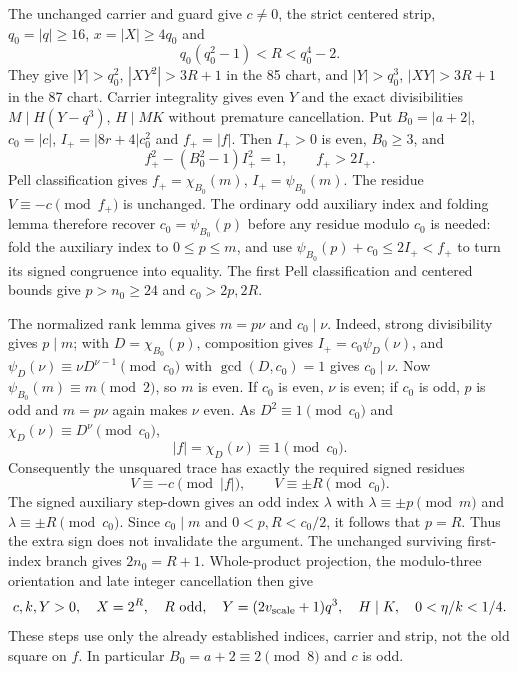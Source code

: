 The unchanged carrier and guard give $c\ne0$, the strict centered strip,
$q_0=|q|\ge16$, $x=|X|\ge4q_0$ and
\[
 q_0(q_0^2-1)<R<q_0^4-2.
\]
They give $|Y|>q_0^2$, $|XY^2|>3R+1$ in the 85 chart, and $|Y|>q_0^3$,
$|XY|>3R+1$ in the 87 chart. Carrier integrality gives even $Y$ and the exact
divisibilities $M\mid H(Y-q^3)$, $H\mid MK$ without premature cancellation.
Put $B_0=|a+2|$, $c_0=|c|$, $I_+=|8r+4|c_0^2$ and $f_+=|f|$.
Then $I_+>0$ is even, $B_0\ge3$, and
\[
 f_+^2-(B_0^2-1)I_+^2=1,\qquad f_+>2I_+.
\]
Pell classification gives $f_+=\chi_{B_0}(m)$, $I_+=\psi_{B_0}(m)$.
The residue $V\equiv-c\pmod {f_+}$ is unchanged. The ordinary odd auxiliary
index and folding lemma therefore recover $c_0=\psi_{B_0}(p)$ before any
residue modulo $c_0$ is needed: fold the auxiliary index to $0\le p\le m$,
and use $\psi_{B_0}(p)+c_0\le2I_+<f_+$ to turn its signed congruence into
equality. The first Pell classification and centered bounds give $p>n_0\ge24$
and $c_0>2p,2R$.

The normalized rank lemma gives $m=p\nu$ and $c_0\mid\nu$. Indeed, strong
divisibility gives $p\mid m$; with $D=\chi_{B_0}(p)$, composition gives
$I_+=c_0\psi_D(\nu)$, and
$\psi_D(\nu)\equiv \nu D^{\nu-1}\pmod {c_0}$ with $\gcd(D,c_0)=1$ gives $c_0\mid\nu$.
Now $\psi_{B_0}(m)\equiv m\pmod2$, so $m$ is even. If $c_0$ is even,
$\nu$ is even; if $c_0$ is odd, $p$ is odd and $m=p\nu$ again makes $\nu$ even.
As $D^2\equiv1\pmod {c_0}$ and $\chi_D(\nu)\equiv D^\nu\pmod {c_0}$,
\[
 |f|=\chi_D(\nu)\equiv1\pmod {c_0}.
\]
Consequently the unsquared trace has exactly the required signed residues
\[
 V\equiv-c\pmod {|f|},\qquad V\equiv\pm R\pmod {c_0}.
\]
The signed auxiliary step-down gives an odd index $\lambda$ with
$\lambda\equiv\pm p\pmod m$ and $\lambda\equiv\pm R\pmod {c_0}$.
Since $c_0\mid m$ and $0<p,R<c_0/2$, it follows that $p=R$.
Thus the extra sign does not invalidate the argument. The unchanged surviving
first-index branch gives $2n_0=R+1$. Whole-product projection, the modulo-three
orientation and late integer cancellation then give
\[
 c,k,Y>0,\quad X=2^R,\quad R\ \text{odd},\quad
 Y=(2v_{\rm scale}+1)q^3,\quad H\mid K,\quad0<\eta/k<1/4.
\]
These steps use only the already established indices, carrier and strip, not the
old square on $f$. In particular $B_0=a+2\equiv2\pmod8$ and $c$ is odd.


